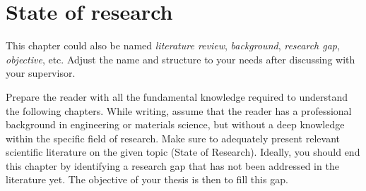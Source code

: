 \chapter{State of research}
{
    \color{orange}
    This chapter could also be named \emph{literature review}, \emph{background}, \emph{research gap}, \emph{objective}, etc.
    Adjust the name and structure to your needs after discussing with your supervisor.
    
    Prepare the reader with all the fundamental knowledge required to understand the following chapters. 
    While writing, assume that the reader has a professional background in engineering or materials science, but without a deep knowledge within the specific field of research. 
    Make sure to adequately present relevant scientific literature on the given topic (State of Research).
    Ideally, you should end this chapter by identifying a research gap that has not been addressed in the literature yet. 
    The objective of your thesis is then to fill this gap.
}